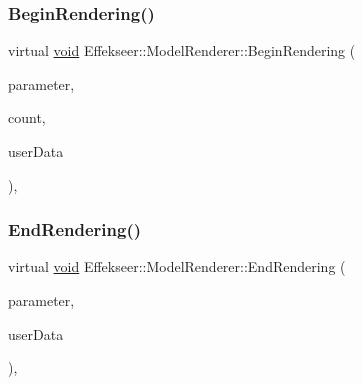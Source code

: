 \subsubsection{\texorpdfstring{Begin\+Rendering()}{BeginRendering()}}
{\footnotesize\ttfamily virtual \mbox{\hyperlink{namespace_effekseer_ab34c4088e512200cf4c2716f168deb56}{void}} Effekseer\+::\+Model\+Renderer\+::\+Begin\+Rendering (\begin{DoxyParamCaption}\item[{const \mbox{\hyperlink{struct_effekseer_1_1_model_renderer_1_1_node_parameter}{Node\+Parameter}} \&}]{parameter,  }\item[{int32\+\_\+t}]{count,  }\item[{\mbox{\hyperlink{namespace_effekseer_ab34c4088e512200cf4c2716f168deb56}{void}} $\ast$}]{user\+Data }\end{DoxyParamCaption})\hspace{0.3cm}{\ttfamily [inline]}, {\ttfamily [virtual]}}

\mbox{\label{class_effekseer_1_1_model_renderer_afabdeb2f4c342416a270c13840175082}} 
\subsubsection{\texorpdfstring{End\+Rendering()}{EndRendering()}}
{\footnotesize\ttfamily virtual \mbox{\hyperlink{namespace_effekseer_ab34c4088e512200cf4c2716f168deb56}{void}} Effekseer\+::\+Model\+Renderer\+::\+End\+Rendering (\begin{DoxyParamCaption}\item[{const \mbox{\hyperlink{struct_effekseer_1_1_model_renderer_1_1_node_parameter}{Node\+Parameter}} \&}]{parameter,  }\item[{\mbox{\hyperlink{namespace_effekseer_ab34c4088e512200cf4c2716f168deb56}{void}} $\ast$}]{user\+Data }\end{DoxyParamCaption})\hspace{0.3cm}{\ttfamily [inline]}, {\ttfamily [virtual]}}

\mbox{\label{class_effekseer_1_1_model_renderer_af83aa3f24f7dc3e7681579f07d0f9086}} 

